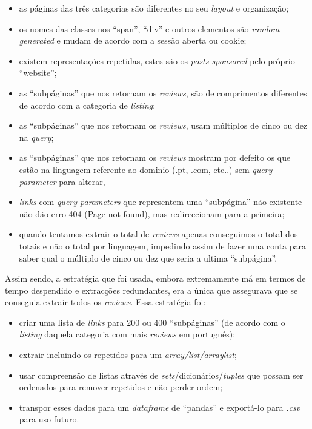 \begin{itemize}
  \item as páginas das três categorias são diferentes no seu \textit{layout} e organização;
  \item os nomes das classes nos ``span'', ``div'' e outros elementos são \textit{random generated} e mudam de acordo com a sessão aberta ou cookie;
  \item existem representações repetidas, estes são os \textit{posts sponsored} pelo próprio ``website'';
  \item as ``subpáginas'' que nos retornam os \textit{reviews}, são de comprimentos diferentes de acordo com a categoria de \textit{listing};
  \item as ``subpáginas'' que nos retornam os \textit{reviews}, usam múltiplos de cinco ou dez na \textit{query};
  \item as ``subpáginas'' que nos retornam os \textit{reviews} mostram por defeito os que estão na linguagem referente ao dominio (.pt, .com, etc..) sem \textit{query parameter} para alterar,
  \item \textit{links} com \textit{query parameters} que representem uma ``subpágina'' não existente não dão erro 404 (Page not found), mas redireccionam para a primeira;
  \item quando tentamos extrair o total de \textit{reviews} apenas conseguimos o total dos totais e não o total por linguagem, impedindo assim de fazer uma conta para saber qual o múltiplo de cinco ou dez que seria a ultima ``subpágina''.
\end{itemize}

Assim sendo, a estratégia que foi usada, embora extremamente má em termos de tempo despendido e extracções redundantes, era a única que assegurava que se conseguia extrair todos os \textit{reviews}. Essa estratégia foi:

\begin{itemize}
  \item criar uma lista de \textit{links} para 200 ou 400 ``subpáginas'' (de acordo com o \textit{listing} daquela categoria com mais \textit{reviews} em português);
  \item extrair incluindo os repetidos para um \textit{array/list/arraylist};
  \item usar compreensão de listas através de \textit{sets}/dicionários/\textit{tuples} que possam ser ordenados para remover repetidos e não perder ordem;
  \item transpor esses dados para um \textit{dataframe} de ``pandas'' e exportá-lo para \textit{.csv} para uso futuro.
\end{itemize}

